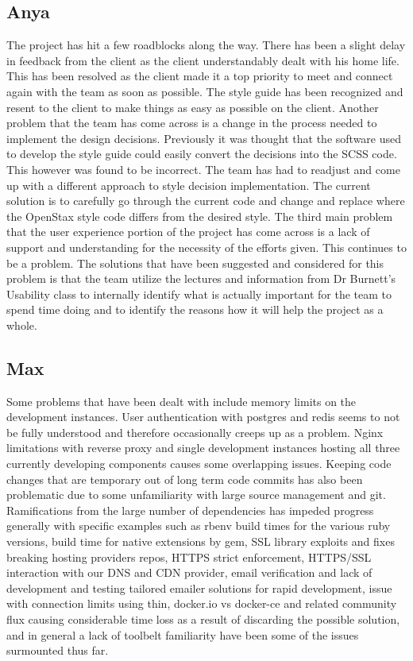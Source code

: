 \documentclass[onecolumn, draftclsnofoot,10pt, compsoc]{IEEEtran}
\begin{document}
\subsection{Anya}
The project has hit a few roadblocks along the way. There has been a slight delay in feedback from the client as the client understandably dealt with his home life. This has been resolved as the client made it a top priority to meet and connect again with the team as soon as possible. The style guide has been recognized and resent to the client to make things as easy as possible on the client. Another problem that the team has come across is a change in the process needed to implement the design decisions. Previously it was thought that the software used to develop the style guide could easily convert the decisions into the SCSS code. This however was found to be incorrect. The team has had to readjust and come up with a different approach to style decision implementation. The current solution is to carefully go through the current code and change and replace where the OpenStax style code differs from the desired style. The third main problem that the user experience portion of the project has come across is a lack of support and understanding for the necessity of the efforts given. This continues to be a problem. The solutions that have been suggested and considered for this problem is that the team utilize the lectures and information from Dr Burnett’s Usability class to internally identify what is actually important for the team to spend time doing and to identify the reasons how it will help the project as a whole.

\subsection{Max}
Some problems that have been dealt with include memory limits on the development instances. User authentication with postgres and redis seems to not be fully understood and therefore occasionally creeps up as a problem. Nginx limitations with reverse proxy and single development instances hosting all three currently developing components causes some overlapping issues. Keeping code changes that are temporary out of long term code commits has also been problematic due to some unfamiliarity with large source management and git. Ramifications from the large number of dependencies has impeded progress generally with specific examples such as rbenv build times for the various ruby versions, build time for native extensions by gem, SSL library exploits and fixes breaking hosting providers repos, HTTPS strict enforcement, HTTPS/SSL interaction with our DNS and CDN provider, email verification and lack of development and testing tailored emailer solutions for rapid development, issue with connection limits using thin, docker.io vs docker-ce and related community flux causing considerable time loss as a result of discarding the possible solution, and in general a lack of toolbelt familiarity have been some of the issues surmounted thus far. 
\end{document}
